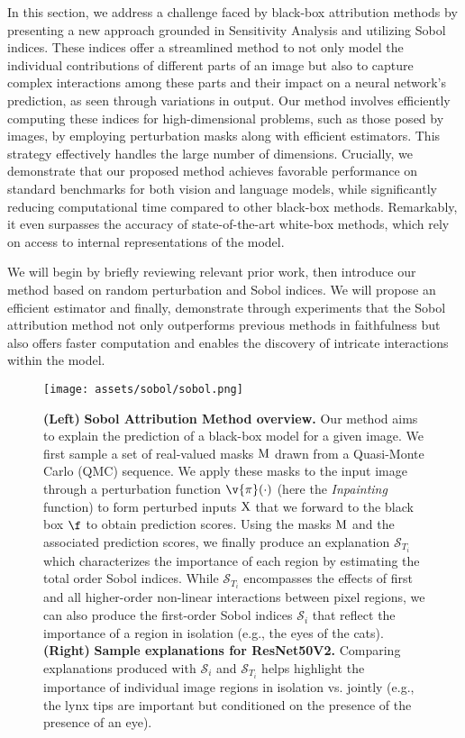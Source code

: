 \newcommand{\sob}{\mathcal{S}}
\newcommand{\Vemp}{\hat{\text{V}}}
\newcommand{\perturbation}{\v{\pi}}
\newcommand{\estA}{\rm{A}}
\newcommand{\estB}{\rm{B}}
\newcommand{\estAB}{\rm{C}}

In this section, we address a challenge faced by black-box attribution methods by presenting a new approach grounded in Sensitivity Analysis and utilizing Sobol indices. These indices offer a streamlined method to not only model the individual contributions of different parts of an image but also to capture complex interactions among these parts and their impact on a neural network's prediction, as seen through variations in output.
Our method involves efficiently computing these indices for high-dimensional problems, such as those posed by images, by employing perturbation masks along with efficient estimators. This strategy effectively handles the large number of dimensions.
Crucially, we demonstrate that our proposed method achieves favorable performance on standard benchmarks for both vision and language models, while significantly reducing computational time compared to other black-box methods. Remarkably, it even surpasses the accuracy of state-of-the-art white-box methods, which rely on access to internal representations of the model.

We will begin by briefly reviewing relevant prior work, then introduce our method based on random perturbation and Sobol indices. We will propose an efficient estimator and finally, demonstrate through experiments that the Sobol attribution method not only outperforms previous methods in faithfulness but also offers faster computation and enables the discovery of intricate interactions within the model.


\begin{figure*}[ht]
    \centering
    \texttt{[image: assets/sobol/sobol.png]}
    \caption{\textbf{(Left)} \textbf{Sobol Attribution Method overview.}
    Our method aims to explain the prediction of a black-box model for a given image. We first sample a set of real-valued masks $\rm{M}$ drawn from a Quasi-Monte Carlo (QMC) sequence.
    We apply these masks to the input image through a perturbation function $\perturbation(\cdot)$ (here the \textit{Inpainting} function) to form perturbed inputs $\rm{X}$ that we forward to the black box $\f$ to obtain prediction scores.
    Using the masks $\rm{M}$ and the associated prediction scores, we finally produce an explanation $\sob_{T_i}$ which characterizes the importance of each region by estimating the total order Sobol indices.
    While $\sob_{T_i}$ encompasses the effects of first and all higher-order non-linear interactions between pixel regions, we can also produce the first-order Sobol indices $\sob_i$ that reflect the importance of a region in isolation (e.g., the eyes of the cats).
    \textbf{(Right)} \textbf{Sample explanations for ResNet50V2.}
    Comparing explanations produced with $\sob_i$ and $\sob_{T_i}$ helps highlight the importance of individual image regions in isolation vs. jointly (e.g., the lynx tips are important but conditioned on the presence of the presence of an eye).
    }
    \vspace{-0.5cm}
    \label{fig:sobol}
\end{figure*}


